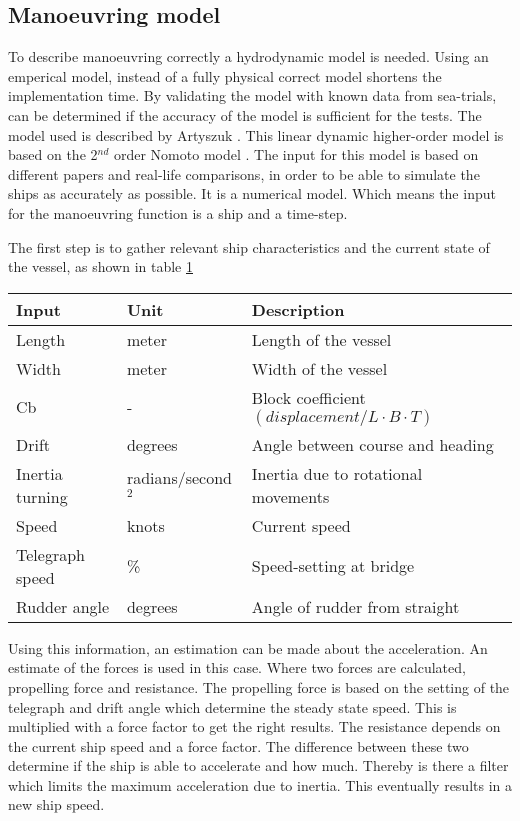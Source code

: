 \subsection{Manoeuvring model}
\label{apps:hydro-model}
To describe manoeuvring correctly a hydrodynamic model is needed. Using an emperical model, instead of a fully physical correct model shortens the implementation time. By validating the model with known data from sea-trials, can be determined if the accuracy of the model is sufficient for the tests. The model used is described by Artyszuk \cite{Artyszuk2016}. This linear dynamic higher-order model is based on the 2$^{nd}$ order Nomoto model \cite{Nomoto1957}. The input for this model is based on different papers and real-life comparisons, in order to be able to simulate the ships as accurately as possible. It is a numerical model. Which means the input for the manoeuvring function is a ship and a time-step.

The first step is to gather relevant ship characteristics and the current state of the vessel, as shown in table \ref{tab:input-hydro-model}
\begin{table}[p]
	\centering
	\begin{tabular}{p{}|p{}|p{}}
		\toprule
		Input & Unit & Description\\
		\midrule
		Length & meter & Length of the vessel\\
		Width & meter & Width of the vessel \\
		Cb & - & Block coefficient $(displacement / L \cdot B \cdot T)$ \\
		Drift & degrees & Angle between course and heading \\
		Inertia turning & radians/second$^2$ & Inertia due to rotational movements \\
		Speed & knots & Current speed \\
		Telegraph speed & \% & Speed-setting at bridge\\
		Rudder angle & degrees & Angle of rudder from straight \\
		\bottomrule
	\end{tabular}
	
	\label{tab:input-hydro-model}
\end{table}

Using this information, an estimation can be made about the acceleration. An estimate of the forces is used in this case. Where two forces are calculated, propelling force and resistance. The propelling force is based on the setting of the telegraph and drift angle which determine the steady state speed. This is multiplied with a force factor to get the right results. The resistance depends on the current ship speed and a force factor. The difference between these two determine if the ship is able to accelerate and how much. Thereby is there a filter which limits the maximum acceleration due to inertia. This eventually results in a new ship speed.

